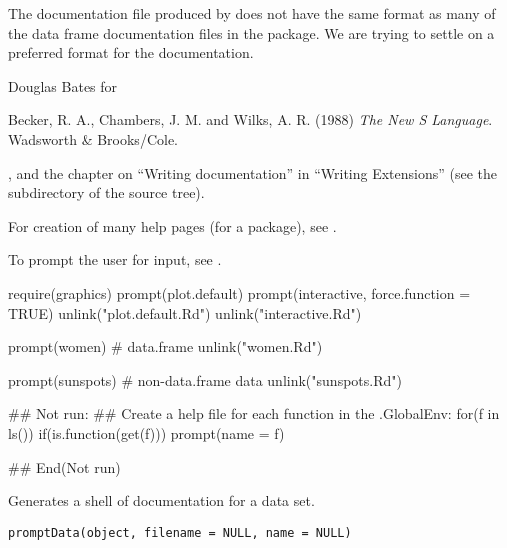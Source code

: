 %
\begin{Note}\relax
The documentation file produced by  does not
have the same format as many of the data frame documentation files in
the  package.  We are trying to settle on a preferred
format for the documentation.
\end{Note}
%
\begin{Author}\relax
Douglas Bates for 
\end{Author}
%
\begin{References}\relax
Becker, R. A., Chambers, J. M. and Wilks, A. R. (1988)
\emph{The New S Language}.
Wadsworth \& Brooks/Cole.
\end{References}
%
\begin{SeeAlso}\relax
{},  and the chapter on
``Writing \R{} documentation'' in ``Writing \R{} Extensions''
(see the  subdirectory of the \R{} source tree).

For creation of many help pages (for a package),
see .

To prompt the user for input, see .
\end{SeeAlso}
%
\begin{Examples}
\begin{ExampleCode}
require(graphics)
prompt(plot.default)
prompt(interactive, force.function = TRUE)
unlink("plot.default.Rd")
unlink("interactive.Rd")

prompt(women) # data.frame
unlink("women.Rd")

prompt(sunspots) # non-data.frame data
unlink("sunspots.Rd")

## Not run: 
## Create a help file for each function in the .GlobalEnv:
for(f in ls()) if(is.function(get(f))) prompt(name = f)

## End(Not run)

\end{ExampleCode}
\end{Examples}
%
\begin{Description}\relax
Generates a shell of documentation for a data set.
\end{Description}
%
\begin{Usage}
\begin{verbatim}
promptData(object, filename = NULL, name = NULL)
\end{verbatim}
\end{Usage}
